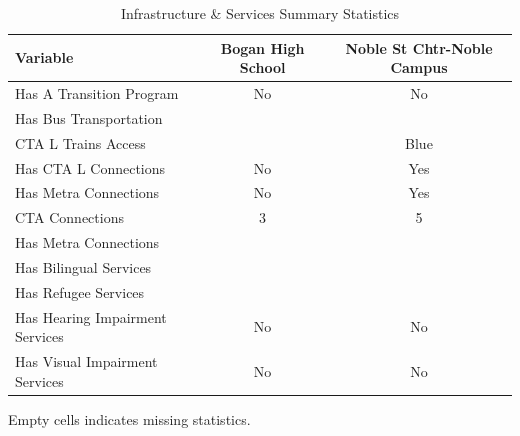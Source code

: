 \begin{table}[H]
\renewcommand{\arraystretch}{1.5}
\caption*{
{\large Infrastructure \& Services Summary Statistics}
} 

\fontsize{10pt}{11pt}\selectfont

\begin{tabular*}{\linewidth}{@{\extracolsep{\fill}}lcc}
\toprule
Variable & Bogan High School & Noble St Chtr-Noble Campus \\ 
\midrule\addlinespace[2.5pt]
Has A Transition Program & No & No \\
Has Bus Transportation &  &  \\
CTA L Trains Access &  & Blue \\
Has CTA L Connections & No & Yes \\
Has Metra Connections & No & Yes \\
CTA Connections & 3 & 5 \\
Has Metra Connections &  &  \\
Has Bilingual Services &  &  \\
Has Refugee Services &  &  \\
Has Hearing Impairment Services & No & No \\
Has Visual Impairment Services & No & No \\
\bottomrule
\end{tabular*}
\begin{minipage}{\linewidth}
Empty cells indicates missing statistics.\\
\end{minipage}
\end{table}

